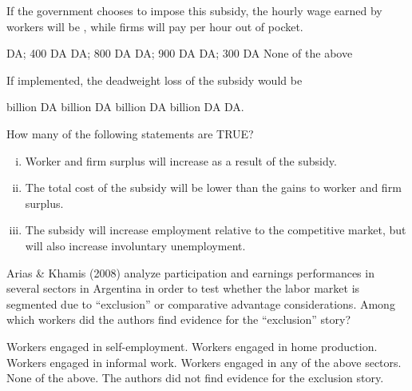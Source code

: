 \documentclass[addpoints,11pt]{exam}
\theoremstyle{definition}
\newcommand{\blank}[0]{\underline{\hspace{3cm}}}
\begin{document}
\begin{questions}
	
	\question \label{q1} If the government chooses to impose this subsidy, the hourly wage earned by workers will be \blank, while firms will pay \blank per hour out of pocket. 
	
\begin{choices}
	 DA; 400 DA
	 DA; 800 DA
	 DA; 900 DA
	 DA; 300 DA
	\choice None of the above
\end{choices}

\question If implemented, the deadweight loss of the subsidy would be

\begin{choices}
	 billion DA
	 billion DA
	 billion DA
	 billion DA
	 DA.
\end{choices}

\newpage
	
\question \label{q2} How many of the following statements are TRUE?

\begin{enumerate}[i.]
	\item Worker and firm surplus will increase as a result of the subsidy.
	\item The total cost of the subsidy will be lower than the gains to worker and firm surplus.
	\item The subsidy will increase employment relative to the competitive market, but will also increase involuntary unemployment.
\end{enumerate}
	
	
\begin{choices}
\end{choices}
	
 
\question Arias \& Khamis (2008) analyze participation and earnings performances in several sectors in Argentina in order to test whether the labor market is segmented due to ``exclusion'' or comparative advantage considerations. Among which workers did the authors find evidence for the ``exclusion'' story?

\begin{choices}
	\choice Workers engaged in self-employment.
	\choice Workers engaged in home production.
	\CorrectChoice Workers engaged in informal work.
	\choice Workers engaged in any of the above sectors.
	\choice None of the above. The authors did not find evidence for the exclusion story.
\end{choices}


\end{questions}
\end{document}
